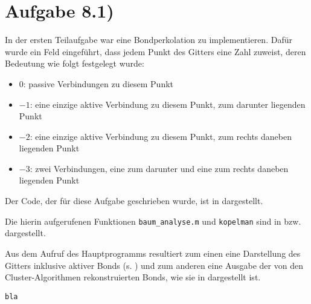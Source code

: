 \section*{Aufgabe 8.1)}
In der ersten Teilaufgabe war eine Bondperkolation zu implementieren. Dafür wurde
ein Feld eingeführt, dass jedem Punkt des Gitters eine Zahl zuweist, deren Bedeutung
wie folgt festgelegt wurde:
\begin{itemize}
\item $0$: passive Verbindungen zu diesem Punkt
\item $-1$: eine einzige aktive Verbindung zu diesem Punkt, zum darunter liegenden Punkt
\item $-2$: eine einzige aktive Verbindung zu diesem Punkt, zum rechts daneben liegenden Punkt
\item $-3$: zwei Verbindungen, eine zum darunter und eine zum rechts daneben liegenden Punkt
\end{itemize}

Der Code, der für diese Aufgabe geschrieben wurde, ist in  dargestellt.



Die hierin aufgerufenen Funktionen \texttt{baum\_analyse.m} und \texttt{kopelman} sind in  bzw.  dargestellt.




Aus dem Aufruf des Hauptprogramms resultiert zum einen eine Darstellung des Gitters
inklusive aktiver Bonds (s. ) und zum anderen eine Ausgabe der von den
Cluster-Algorithmen rekonstruierten Bonds, wie sie in  dargestellt ist.


\begin{lstlisting}[caption=Ausgabe von \lref{bond_perk},label=lst:output]
bla
\end{lstlisting}